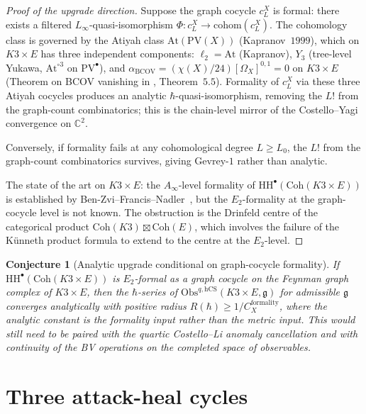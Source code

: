 \documentclass[11pt]{article}
\providecommand{\frakg}{\mathfrak{g}}
\providecommand{\hCS}{\mathrm{hCS}}
\providecommand{\Obs}{\mathrm{Obs}}
\providecommand{\HH}{\mathrm{HH}}
\providecommand{\C}{\mathbb{C}}
\providecommand{\Coh}{\mathrm{Coh}}
\providecommand{\PV}{\mathrm{PV}}
\newtheorem{conjecture}[theorem]{Conjecture}
\theoremstyle{definition}\newtheorem{definition}[theorem]{Definition}
\theoremstyle{remark}\newtheorem{remark}[theorem]{Remark}\newtheorem{example}[theorem]{Example}
\begin{document}
\begin{proof}[Proof of the upgrade direction]
Suppose the graph cocycle $c_L^X$ is formal: there exists a filtered
$L_\infty$-quasi-isomorphism $\Phi: c_L^X\to\mathrm{cohom}(c_L^X)$.
The cohomology class is governed by the Atiyah class $\mathrm{At}(\PV(X))$
(Kapranov~$1999$), which on $K3\times E$ has three independent
components: $\ell_2 = \mathrm{At}$ (Kapranov), $Y_3$ (tree-level
Yukawa, $\mathrm{At}^{\circ 3}$ on $\PV^{\bullet}$), and
$\alpha_{\mathrm{BCOV}} = (\chi(X)/24)[\Omega_X]^{0,1} = 0$ on $K3\times E$
(Theorem on BCOV vanishing in \cite{cy_to_chiral}, Theorem~$5.5$).
Formality of $c_L^X$ via these three Atiyah cocycles produces an
analytic $\hbar$-quasi-isomorphism, removing the $L!$ from the
graph-count combinatorics; this is the chain-level mirror of the
Costello--Yagi convergence on $\C^2$.

Conversely, if formality fails at any cohomological degree $L\geq L_0$,
the $L!$ from the graph-count combinatorics survives, giving
Gevrey-$1$ rather than analytic.

The state of the art on $K3\times E$: the $A_\infty$-level formality
of $\HH^\bullet(\Coh(K3\times E))$ is established by
Ben-Zvi--Francis--Nadler~\cite{BZFN}, but the $E_2$-formality at the
graph-cocycle level is not known. The obstruction is the Drinfeld
centre of the categorical product $\Coh(K3)\boxtimes\Coh(E)$, which
involves the failure of the K\"unneth product formula to extend to
the centre at the $E_2$-level.
\end{proof}

\begin{conjecture}[Analytic upgrade conditional on graph-cocycle formality]
\label{conj:analytic-upgrade-conditional}
If $\HH^\bullet(\Coh(K3\times E))$ is $E_2$-formal as a graph cocycle
on the Feynman graph complex of $K3\times E$, then the $\hbar$-series
of $\Obs^{q,\hCS}(K3\times E,\frakg)$ for admissible $\frakg$ converges
analytically with positive radius
$R(\hbar)\geq 1/C_X^{\mathrm{formality}}$, where the analytic constant
is the formality input rather than the metric input. This would still
need to be paired with the quartic Costello--Li anomaly cancellation
and with continuity of the BV operations on the completed space of
observables.
\end{conjecture}

\section{Three attack-heal cycles}
\label{sec:attack-heal}
\end{document}

